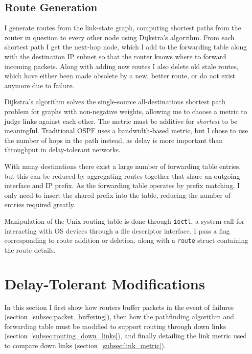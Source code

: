 \documentclass[withindex,glossary,openany]{cam-thesis}
\begin{document}
\subsection{Route Generation}
\label{subsec:route_generation}

I generate routes from the link-state graph, computing shortest paths from the router in question to every other node using Dijkstra's algorithm. From each shortest path I get the next-hop node, which I add to the forwarding table along with the destination IP subnet so that the router knows where to forward incoming packets. Along with adding new routes I also delete old stale routes, which have either been made obsolete by a new, better route, or do not exist anymore due to failure.

Dijkstra's algorithm solves the single-source all-destinations shortest path problem for graphs with non-negative weights, allowing me to choose a metric to judge links against each other. The metric must be additive for \textit{shortest} to be meaningful. Traditional OSPF uses a bandwidth-based metric, but I chose to use the number of hops in the path instead, as delay is more important than throughput in delay-tolerant networks.

With many destinations there exist a large number of forwarding table entries, but this can be reduced by aggregating routes together that share an outgoing interface and IP prefix. As the forwarding table operates by prefix matching, I only need to insert the shared prefix into the table, reducing the number of entries required greatly.

Manipulation of the Unix routing table is done through \texttt{ioctl}, a system call for interacting with OS devices through a file descriptor interface. I pass a flag corresponding to route addition or deletion, along with a \texttt{route} struct containing the route details.

\section{Delay-Tolerant Modifications}
\label{sec:dtlsr_design}

In this section I first show how routers buffer packets in the event of failures (section~\ref{subsec:packet_buffering}), then how the pathfinding algorithm and forwarding table must be modified to support routing through down links (section~\ref{subsec:routing_down_links}), and finally detailing the link metric used to compare down links (section~\ref{subsec:link_metric}).
\end{document}
